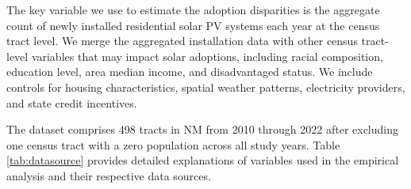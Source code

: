 \documentclass[11pt,twoside,letterpaper]{article}
\begin{document}
The key variable we use to estimate the adoption disparities is the aggregate count of newly installed residential solar PV systems each year at the census tract level. We merge the aggregated installation data with other census tract-level variables that may impact solar adoptions, including racial composition, education level, area median income, and disadvantaged status. We include controls for housing characteristics, spatial weather patterns, electricity providers, and state credit incentives.

The dataset comprises 498 tracts in NM from 2010 through 2022 after excluding one census tract with a zero population across all study years. Table \ref{tab:datasource} provides detailed explanations of variables used in the empirical analysis and their respective data sources. 
\end{document}
